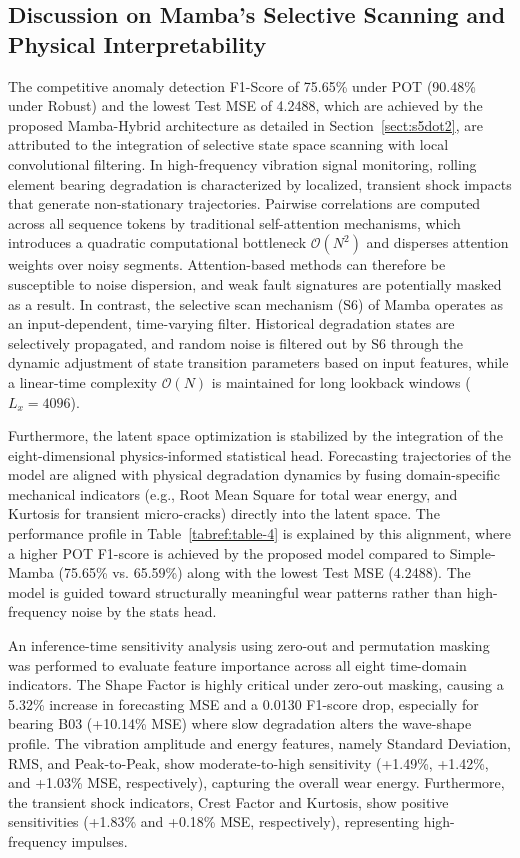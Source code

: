 \documentclass[cmes,article,submit,moreauthors,pdftex]{Definitions/tsp}
\begin{document}
\subsection{Discussion on Mamba's Selective Scanning and Physical Interpretability} \label{sect:s5dot6}
The competitive anomaly detection F1-Score of 75.65\% under POT (90.48\% under Robust) and the lowest Test MSE of 4.2488, which are achieved by the proposed Mamba-Hybrid architecture as detailed in Section~\ref{sect:s5dot2}, are attributed to the integration of selective state space scanning with local convolutional filtering. In high-frequency vibration signal monitoring, rolling element bearing degradation is characterized by localized, transient shock impacts that generate non-stationary trajectories. Pairwise correlations are computed across all sequence tokens by traditional self-attention mechanisms, which introduces a quadratic computational bottleneck $\mathcal{O}(N^2)$ and disperses attention weights over noisy segments. Attention-based methods can therefore be susceptible to noise dispersion, and weak fault signatures are potentially masked as a result. In contrast, the selective scan mechanism ($\text{S}6$) of Mamba operates as an input-dependent, time-varying filter. Historical degradation states are selectively propagated, and random noise is filtered out by $\text{S}6$ through the dynamic adjustment of state transition parameters based on input features, while a linear-time complexity $\mathcal{O}(N)$ is maintained for long lookback windows ($L_x = 4096$).

Furthermore, the latent space optimization is stabilized by the integration of the eight-dimensional physics-informed statistical head. Forecasting trajectories of the model are aligned with physical degradation dynamics by fusing domain-specific mechanical indicators (e.g., Root Mean Square for total wear energy, and Kurtosis for transient micro-cracks) directly into the latent space. The performance profile in Table~\ref{tabref:table-4} is explained by this alignment, where a higher POT F1-score is achieved by the proposed model compared to Simple-Mamba (75.65\% vs. 65.59\%) along with the lowest Test MSE (4.2488). The model is guided toward structurally meaningful wear patterns rather than high-frequency noise by the stats head.

An inference-time sensitivity analysis using zero-out and permutation masking was performed to evaluate feature importance across all eight time-domain indicators. The Shape Factor is highly critical under zero-out masking, causing a 5.32\% increase in forecasting MSE and a 0.0130 F1-score drop, especially for bearing B03 (+10.14\% MSE) where slow degradation alters the wave-shape profile. The vibration amplitude and energy features, namely Standard Deviation, RMS, and Peak-to-Peak, show moderate-to-high sensitivity (+1.49\%, +1.42\%, and +1.03\% MSE, respectively), capturing the overall wear energy. Furthermore, the transient shock indicators, Crest Factor and Kurtosis, show positive sensitivities (+1.83\% and +0.18\% MSE, respectively), representing high-frequency impulses.
\end{document}
